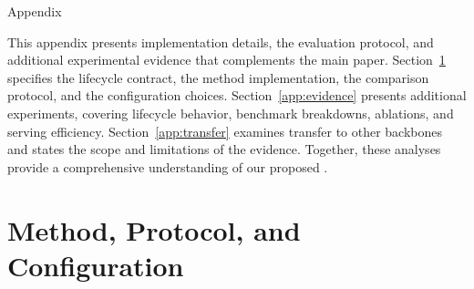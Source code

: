 \vspace{1ex}
\centerline{\LARGE\sc Appendix}
\vspace{1.5ex}
\label{app:appendix}
This appendix presents implementation details, the evaluation protocol, and additional experimental evidence that complements the main paper.
%
Section~\ref{app:method-details} specifies the lifecycle contract, the method implementation, the comparison protocol, and the configuration choices.
%
Section~\ref{app:evidence} presents additional experiments, covering lifecycle behavior, benchmark breakdowns, ablations, and serving efficiency.
%
Section~\ref{app:transfer} examines transfer to other backbones and states the scope and limitations of the evidence.
%
Together, these analyses provide a comprehensive understanding of our proposed \method{}.
\renewcommand{\topfraction}{0.85}
\renewcommand{\bottomfraction}{0.75}
\renewcommand{\textfraction}{0.12}
\renewcommand{\floatpagefraction}{0.5}
\setcounter{topnumber}{2}
\setcounter{bottomnumber}{2}
\setcounter{totalnumber}{4}
\setlength{\textfloatsep}{8pt plus 2pt minus 3pt}
\setlength{\intextsep}{6pt plus 2pt minus 2pt}
\setlength{\floatsep}{8pt plus 2pt minus 2pt}
\raggedbottom
\makeatletter
\let\trace@origtable\table
\def\table{\@ifnextchar[\trace@tableopt{\trace@origtable[ht]}}
\def\trace@tableopt[#1]{\trace@origtable[ht]}
\makeatother
\section{Method, Protocol, and Configuration}
\label{app:method-details}
